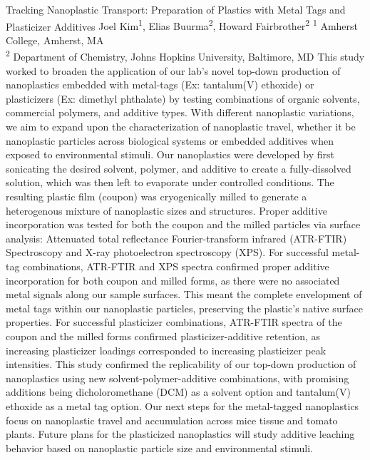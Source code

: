 \makeabstract
    {
    Tracking Nanoplastic Transport: Preparation of Plastics with Metal Tags and Plasticizer Additives
    }
    {
    Joel Kim\textsuperscript{1}, Elias Buurma\textsuperscript{2}, Howard Fairbrother\textsuperscript{2}
    }
    {
    \textsuperscript{1} Amherst College, Amherst, MA\\
\textsuperscript{2} Department of Chemistry, Johns Hopkins University, Baltimore, MD
    }
    {
    This study worked to broaden the application of our lab{\textquoteright}s novel top-down production of nanoplastics embedded with metal-tags (Ex: tantalum(V) ethoxide) or plasticizers (Ex: dimethyl phthalate) by testing combinations of organic solvents, commercial polymers, and additive types. With different nanoplastic variations, we aim to expand upon the characterization of nanoplastic travel, whether it be nanoplastic particles across biological systems or embedded additives when exposed to environmental stimuli.
    }
    {
    Our nanoplastics were developed by first sonicating the desired solvent, polymer, and additive to create a fully-dissolved solution, which was then left to evaporate under controlled conditions. The resulting plastic film (coupon) was cryogenically milled to generate a heterogenous mixture of nanoplastic sizes and structures. Proper additive incorporation was tested for both the coupon and the milled particles via surface analysis: Attenuated total reflectance Fourier-transform infrared (ATR-FTIR) Spectroscopy and X-ray photoelectron spectroscopy (XPS).
    }
    {
    For successful metal-tag combinations, ATR-FTIR and XPS spectra confirmed proper additive incorporation for both coupon and milled forms, as there were no associated metal signals along our sample surfaces. This meant the complete envelopment of metal tags within our nanoplastic particles, preserving the plastic{\textquoteright}s native surface properties. For successful plasticizer combinations, ATR-FTIR spectra of the coupon and the milled forms confirmed plasticizer-additive retention, as increasing plasticizer loadings corresponded to increasing plasticizer peak intensities.
    }
    {
    This study confirmed the replicability of our top-down production of nanoplastics using new solvent-polymer-additive combinations, with promising additions being dicholoromethane (DCM) as a solvent option and tantalum(V) ethoxide as a metal tag option. Our next steps for the metal-tagged nanoplastics focus on nanoplastic travel and accumulation across mice tissue and tomato plants. Future plans for the plasticized nanoplastics will study additive leaching behavior based on nanoplastic particle size and environmental stimuli.
    }

    \newpage
    